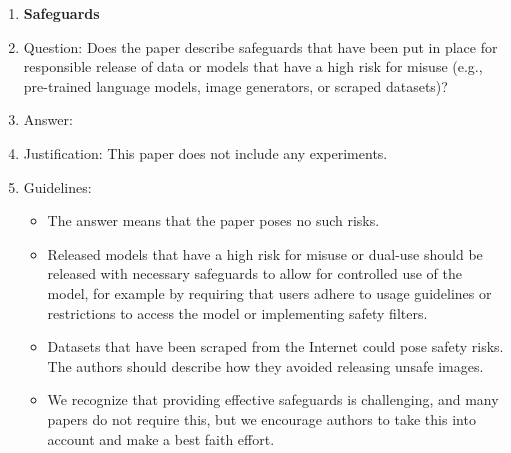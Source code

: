 \documentclass{article}
\theoremstyle{definition}
\theoremstyle{remark}
\begin{document}
\begin{enumerate}
\item {\bf Safeguards}
    \item[] Question: Does the paper describe safeguards that have been put in place for responsible release of data or models that have a high risk for misuse (e.g., pre-trained language models, image generators, or scraped datasets)?
    \item[] Answer: \answerNA{} %
    \item[] Justification: This paper does not include any experiments.
    \item[] Guidelines:
    \begin{itemize}
        \item The answer \answerNA{} means that the paper poses no such risks.
        \item Released models that have a high risk for misuse or dual-use should be released with necessary safeguards to allow for controlled use of the model, for example by requiring that users adhere to usage guidelines or restrictions to access the model or implementing safety filters. 
        \item Datasets that have been scraped from the Internet could pose safety risks. The authors should describe how they avoided releasing unsafe images.
        \item We recognize that providing effective safeguards is challenging, and many papers do not require this, but we encourage authors to take this into account and make a best faith effort.
    \end{itemize}


\end{enumerate}
\end{document}
